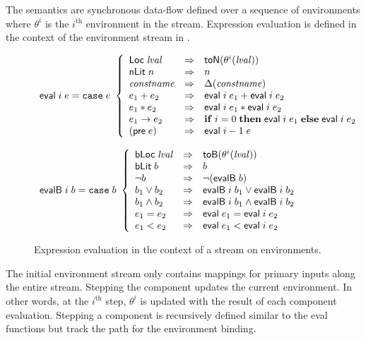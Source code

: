The semantics are synchronous data-flow defined over a sequence of environments where $\theta^i$ is the $i^\mathrm{th}$ environment in the stream. Expression evaluation is defined in the context of the environment stream in .
\begin{figure*}
\[
\begin{array}{l}
\mathsf{eval}\; i\; e =
\mathtt{case}\; e\
 \left\{
 \begin{array}{lcl}
    \mathsf{Loc}\; \mathit{lval} & \Rightarrow & \mathsf{toN}(\theta^i(\mathit{lval})) \\
    \mathsf{nLit}\; n & \Rightarrow & n  \\
    \mathit{constname} & \Rightarrow & \Delta(\mathit{constname})  \\
    e_1 + e_2 & \Rightarrow & \mathsf{eval}\; i \; e_1 + \mathsf{eval}\; i \; e_2  \\
    e_1 * e_2 & \Rightarrow & \mathsf{eval}\; i \; e_1 * \mathsf{eval}\; i \; e_2  \\
    e_1 \rightarrow e_2 & \Rightarrow &  \mathbf{if}\; i = 0\; \mathbf{then}\; \mathsf{eval}\; i \; e_1\; 
                                         \mathbf{else}\; \mathsf{eval}\; i \; e_2 \\
    (\mathsf{pre}\; e) & \Rightarrow &  \mathsf{eval}\; i-1 \; e
  \end{array}
 \right.
 \\ \\
\mathsf{evalB}\; i \; b =
\mathtt{case}\; b\
 \left\{
 \begin{array}{lcl}
    \mathsf{bLoc}\; \mathit{lval} & \Rightarrow & \mathsf{toB}(\theta^i(\mathit{lval})) \\
    \mathsf{bLit}\; b & \Rightarrow & b \\
    \neg b & \Rightarrow & \neg(\mathsf{evalB} \; b)  \\
    b_1 \lor b_2 & \Rightarrow & \mathsf{evalB}\; i \;b_1 \lor \mathsf{evalB}\; i \;b_2   \\
    b_1 \land b_2 & \Rightarrow & \mathsf{evalB}\; i \;b_1 \land \mathsf{evalB}\; i \;b_2   \\
    e_1 = e_2 & \Rightarrow & \mathsf{eval} \;e_1 = \mathsf{eval}\; i \;e_2   \\
    e_1 < e_2 & \Rightarrow & \mathsf{eval} \;e_1 < \mathsf{eval}\; i \;e_2
  \end{array}
 \right.
\end{array}
\]
\caption{Expression evaluation in the context of a stream on environments.}
\label{fig:eval}
\end{figure*}

The initial environment stream only contains mappings for primary inputs along the entire stream. Stepping the component updates the current environment. In other words, at the $i^\mathrm{th}$ step, $\theta^i$ is updated with the result of each component evaluation. Stepping a component is recursively defined similar to the eval functions but track the path for the environment binding.  